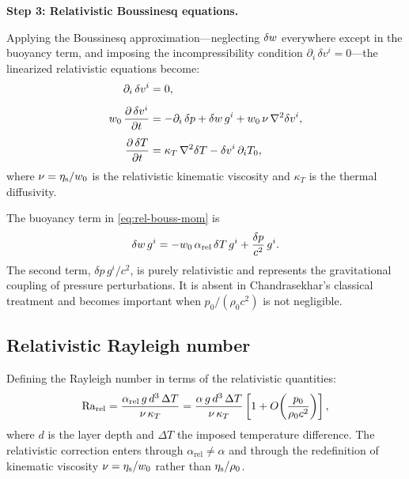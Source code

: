 \medskip\noindent
\textbf{Step 3: Relativistic Boussinesq equations.}

Applying the Boussinesq approximation---neglecting $\delta w$
everywhere except in the buoyancy term, and imposing the
incompressibility condition $\partial_i\,\delta v^i = 0$---the
linearized relativistic equations become:
\begin{align}
  \partial_i\,\delta v^i &= 0,
  \label{eq:rel-bouss-div}\\[4pt]
  w_0\,\frac{\partial\,\delta v^i}{\partial t}
  &= -\partial_i\,\delta p
    + \delta w\, g^i
    + w_0\,\nu\,\nabla^2\delta v^i,
  \label{eq:rel-bouss-mom}\\[4pt]
  \frac{\partial\,\delta T}{\partial t}
  &= \kappa_T\,\nabla^2\delta T
    - \delta v^i\,\partial_i T_0,
  \label{eq:rel-bouss-temp}
\end{align}
where $\nu = \eta_{\mathrm{s}}/w_0$ is the relativistic kinematic
viscosity and $\kappa_T$ is the thermal diffusivity.

The buoyancy term in \eqref{eq:rel-bouss-mom} is
\begin{equation}
  \delta w\, g^i
    = -w_0\,\alpha_{\mathrm{rel}}\,\delta T\, g^i
      + \frac{\delta p}{c^2}\, g^i.
  \label{eq:rel-buoyancy}
\end{equation}
The second term, $\delta p\, g^i / c^2$, is purely relativistic
and represents the gravitational coupling of pressure
perturbations.  It is absent in Chandrasekhar's classical treatment
and becomes important when $p_0/(\rho_0 c^2)$ is not negligible.

\subsection{Relativistic Rayleigh number}
\label{sec:rel-rayleigh}

Defining the Rayleigh number in terms of the relativistic quantities:
\begin{equation}
  \Ra_{\mathrm{rel}}
    = \frac{\alpha_{\mathrm{rel}}\, g\, d^3\,\Delta T}%
      {\nu\,\kappa_T}
    = \frac{\alpha\, g\, d^3\,\Delta T}{\nu\,\kappa_T}
      \left[1 + O\!\left(\frac{p_0}{\rho_0 c^2}\right)\right],
  \label{eq:rel-rayleigh}
\end{equation}
where $d$ is the layer depth and $\Delta T$ the imposed temperature
difference.  The relativistic correction enters through
$\alpha_{\mathrm{rel}} \neq \alpha$ and through the redefinition
of kinematic viscosity $\nu = \eta_{\mathrm{s}}/w_0$ rather than
$\eta_{\mathrm{s}}/\rho_0$.

